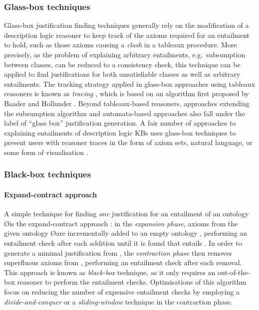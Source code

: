 \subsubsection{Glass-box techniques}

Glass-box justification finding techniques generally rely on the modification of a description logic reasoner to keep track of the axioms required for an entailment to hold, such as those axioms causing a \emph{clash} in a tableaux procedure. More precisely, as the problem of explaining arbitrary entailments, e.g.\ subsumption between classes, can be reduced to a consistency check, this technique can be applied to find justifications for both unsatisfiable classes as well as arbitrary entailments. The tracking strategy applied in glass-box approaches using tableaux reasoners is known as \emph{tracing} \cite{kalyanpur05mi}, which is based on an algorithm first proposed by Baader and Hollunder \cite{baader95aa}. Beyond tableaux-based reasoners, approaches extending the \elplusplus subsumption algorithm \cite{baader07xp} and automata-based approaches \cite{baader08eb,baader10jc} also fall under the label of \enquote{glass box} justification generation. A fair number of approaches to explaining entailments of description logic KBs uses glass-box techniques to present users with reasoner traces in the form of axiom sets, natural language, or some form of visualisation \cite{schlobach03nc,liebig05lf,kwong05aa,meyer06rj}.


\subsubsection{Black-box techniques}

\paragraph{Expand-contract approach}
A simple technique for finding \emph{one} justification for an entailment \ent of an ontology \O is the expand-contract approach \cite{kalyanpur07oq}: in the \emph{expansion phase}, axioms from the given ontology \O are incrementally added to an empty ontology \oprime, performing an entailment check after each addition until it is found that \oprime entails \ent. In order to generate a minimal justification from \oprime, the \emph{contraction phase} then removes superfluous axioms from \oprime, performing an entailment check after each removal. This approach is known as \emph{black-box} technique, as it only requires an out-of-the-box reasoner to perform the entailment checks. Optimisations of this algorithm focus on reducing the number of expensive entailment checks by employing a \emph{divide-and-conquer} \cite{friedrich05rg,shchekotykhin08ay} or a \emph{sliding-window} technique \cite{kalyanpur06nm} in the contraction phase.

